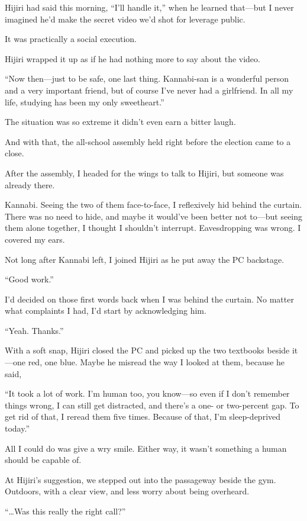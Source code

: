 \documentclass[
    a4paper,
    12pt,
    twoside,
    openany,
    UTF8,
    fontset=windows
]{ctexbook}
\begin{document}
Hijiri had said this morning, ``I'll handle it,'' when he learned that---but I never imagined he'd make the secret video we'd shot for leverage public.

It was practically a social execution.

Hijiri wrapped it up as if he had nothing more to say about the video.

``Now then---just to be safe, one last thing. Kannabi-san is a wonderful person and a very important friend, but of course I've never had a girlfriend. In all my life, studying has been my only sweetheart.''

The situation was so extreme it didn't even earn a bitter laugh.

And with that, the all-school assembly held right before the election came to a close.

After the assembly, I headed for the wings to talk to Hijiri, but someone was already there.

Kannabi. Seeing the two of them face-to-face, I reflexively hid behind the curtain. There was no need to hide, and maybe it would've been better not to---but seeing them alone together, I thought I shouldn't interrupt. Eavesdropping was wrong. I covered my ears.

Not long after Kannabi left, I joined Hijiri as he put away the PC backstage.

``Good work.''

I'd decided on those first words back when I was behind the curtain. No matter what complaints I had, I'd start by acknowledging him.

``Yeah. Thanks.''

With a soft snap, Hijiri closed the PC and picked up the two textbooks beside it---one red, one blue. Maybe he misread the way I looked at them, because he said,

``It took a lot of work. I'm human too, you know---so even if I don't remember things wrong, I can still get distracted, and there's a one- or two-percent gap. To get rid of that, I reread them five times. Because of that, I'm sleep-deprived today.''

All I could do was give a wry smile. Either way, it wasn't something a human should be capable of.

At Hijiri's suggestion, we stepped out into the passageway beside the gym. Outdoors, with a clear view, and less worry about being overheard.

``\dots Was this really the right call?''
\end{document}
